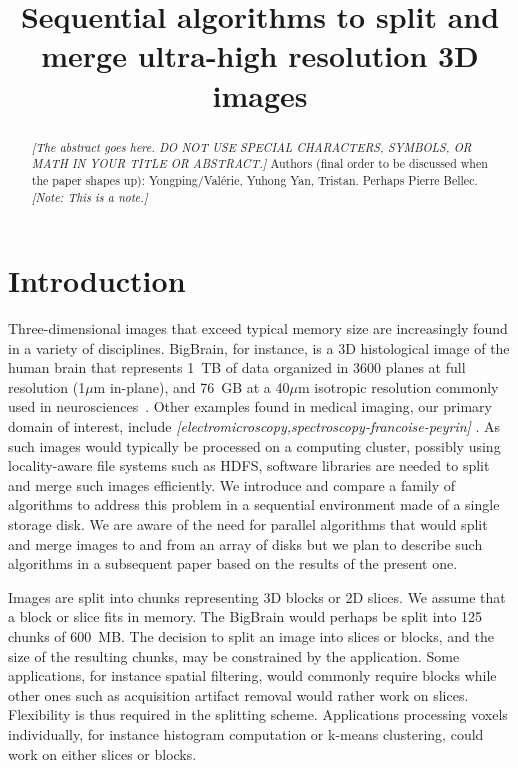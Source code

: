 \documentclass[10pt, conference, compsocconf]{IEEEtran}
\newcommand{\todo}[1]{
  \color{red}\emph{[#1]}
  \color{black}
}
\newcommand{\note}[1]{
  \color{blue}\emph{[Note: #1]}
  \color{black}
}
\begin{document}
\title{Sequential algorithms to split and merge ultra-high resolution 3D images}

\maketitle

\begin{abstract}
  \todo{The abstract goes here. DO NOT USE SPECIAL CHARACTERS,
    SYMBOLS, OR MATH IN YOUR TITLE OR ABSTRACT.}  Authors (final order
  to be discussed when the paper shapes up): Yongping/Val\'erie,
  Yuhong Yan, Tristan. Perhaps Pierre Bellec. \note{This is a note.}
\end{abstract}


\section{Introduction}

Three-dimensional images that exceed typical memory size are
increasingly found in a variety of disciplines. BigBrain, for
instance, is a 3D histological image of the human brain that
represents 1~TB of data organized in 3600 planes at full resolution
(1$\mu$m in-plane), and 76~GB at a 40$\mu$m isotropic resolution
commonly used in neurosciences~\cite{amunts2013bigbrain}. Other
examples found in medical imaging, our primary domain of interest,
include \todo{electromicroscopy,spectroscopy-francoise-peyrin}. As
such images would typically be processed on a computing cluster,
possibly using locality-aware file systems such as HDFS, software
libraries are needed to split and merge such images efficiently. We
introduce and compare a family of algorithms to address this problem
in a sequential environment made of a single storage disk. We are
aware of the need for parallel algorithms that would split and merge
images to and from an array of disks but we plan to describe such
algorithms in a subsequent paper based on the results of the present
one.



Images are split into chunks representing 3D blocks or 2D slices. We
assume that a block or slice fits in memory. The BigBrain would
perhaps be split into 125 chunks of 600~MB. The decision to split an
image into slices or blocks, and the size of the resulting chunks, may
be constrained by the application. Some applications, for instance
spatial filtering, would commonly require blocks while other ones such
as acquisition artifact removal would rather work on
slices. Flexibility is thus required in the splitting
scheme. Applications processing voxels individually, for instance
histogram computation or k-means clustering, could work on either
slices or blocks.
\end{document}
